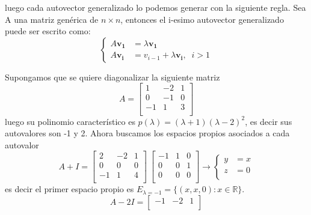luego cada autovector generalizado lo podemos generar con la siguiente regla.
Sea A una matriz genérica de $n \times n$, entonces el i-esimo autovector generalizado puede ser escrito como:
\begin{equation*}
    \begin{cases}
        A \bm{v_1} &= \lambda \bm{v_1} \\
        A \bm{v_i} &= v_{i-1} + \lambda \bm{v_i}, \; \; i>1
    \end{cases}
\end{equation*}
\begin{example}
    Supongamos que se quiere diagonalizar la siguiente matriz
    \begin{equation*}
        A =
        \begin{bmatrix}
        1 & -2 & 1\\
        0 & -1 & 0\\
        -1 & 1 & 3\\
        \end{bmatrix}
    \end{equation*}
    luego su polinomio característico es \( p(\lambda) = (\lambda+1)(\lambda-2)^2 \), es decir sus
    autovalores son -1 y 2. Ahora buscamos los espacios propios asociados a cada autovalor
    \begin{equation*}
        A + I = \begin{bmatrix}
        2 & -2 & 1\\
        0 & 0 & 0\\
        -1 & 1 & 4\\
        \end{bmatrix}
        ~ \begin{bmatrix}
        -1 & 1 & 0\\
        0 & 0 & 1\\
        0 & 0 & 0\\
        \end{bmatrix}
        \rightarrow 
        \begin{cases}
            y &= x \\
            z &= 0 \\
        \end{cases}
    \end{equation*}
    es decir el primer espacio propio es \( E_{\lambda=-1} = \{(x,x,0): x \in \mathbb{R}  \}\).
    \begin{equation*}
        A - 2I = \begin{bmatrix}
        -1 & -2 & 1\\

\end{bmatrix}
\end{equation*}
\end{example}
